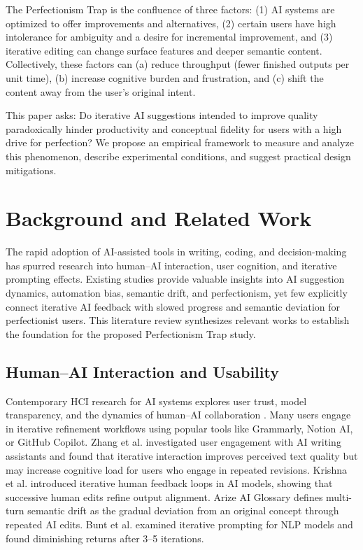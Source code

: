 \documentclass[conference]{IEEEtran} %
\begin{document}
The Perfectionism Trap is the confluence of three factors: (1) AI systems are optimized to offer improvements and alternatives, (2) certain users have high intolerance for ambiguity and a desire for incremental improvement, and (3) iterative editing can change surface features and deeper semantic content. Collectively, these factors can (a) reduce throughput (fewer finished outputs per unit time), (b) increase cognitive burden and frustration, and (c) shift the content away from the user’s original intent.

This paper asks: Do iterative AI suggestions intended to improve quality paradoxically hinder productivity and conceptual fidelity for users with a high drive for perfection? We propose an empirical framework to measure and analyze this phenomenon, describe experimental conditions, and suggest practical design mitigations.

\section{Background and Related Work}
The rapid adoption of AI-assisted tools in writing, coding, and decision-making has spurred research into human–AI interaction, user cognition, and iterative prompting effects. Existing studies provide valuable insights into AI suggestion dynamics, automation bias, semantic drift, and perfectionism, yet few explicitly connect iterative AI feedback with slowed progress and semantic deviation for perfectionist users. This literature review synthesizes relevant works to establish the foundation for the proposed Perfectionism Trap study.

\subsection{Human–AI Interaction and Usability}
Contemporary HCI research for AI systems explores user trust, model transparency, and the dynamics of human–AI collaboration \cite{lee2023}. Many users engage in iterative refinement workflows using popular tools like Grammarly, Notion AI, or GitHub Copilot. Zhang et al. \cite{zhang2023} investigated user engagement with AI writing assistants and found that iterative interaction improves perceived text quality but may increase cognitive load for users who engage in repeated revisions. Krishna et al. \cite{krishna2024} introduced iterative human feedback loops in AI models, showing that successive human edits refine output alignment. Arize AI Glossary \cite{arize2025} defines multi-turn semantic drift as the gradual deviation from an original concept through repeated AI edits. Bunt et al. \cite{bunt2023} examined iterative prompting for NLP models and found diminishing returns after 3–5 iterations.
\end{document}
